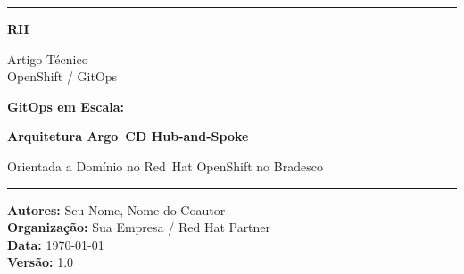 \documentclass[11pt,a4paper]{article}
\begin{document}
\begin{titlepage}

  \noindent\textcolor{rhred}{\rule{\linewidth}{4pt}}
  \vspace{4mm}

  \noindent
  \begin{minipage}[t]{0.15\linewidth}
    \textcolor{rhred}{\textbf{\Large RH}}
  \end{minipage}
  \hfill
  \begin{minipage}[t]{0.45\linewidth}
    \raggedleft\small\color{rhgray}
    Artigo Técnico\\
    OpenShift / GitOps
  \end{minipage}

  \vspace{30mm}

  {\color{rhred}\fontsize{28}{34}\selectfont\bfseries
    GitOps em Escala:\par
  }
  {\fontsize{18}{28}\selectfont\bfseries\color{rhdark}
    Arquitetura Argo~CD Hub-and-Spoke\par
    Orientada a Domínio no Red~Hat OpenShift no Bradesco\par
  }

  \vspace{8mm}
  \textcolor{rhgray}{\rule{0.4\linewidth}{0.8pt}}
  \vspace{6mm}

  {\large\color{rhgray}
    \textbf{Autores:} Seu Nome, Nome do Coautor\\[4pt]
    \textbf{Organização:} Sua Empresa / Red Hat Partner\\[4pt]
    \textbf{Data:} \today\\[4pt]
    \textbf{Versão:} 1.0
  }

  \vfill


\end{titlepage}
\end{document}
